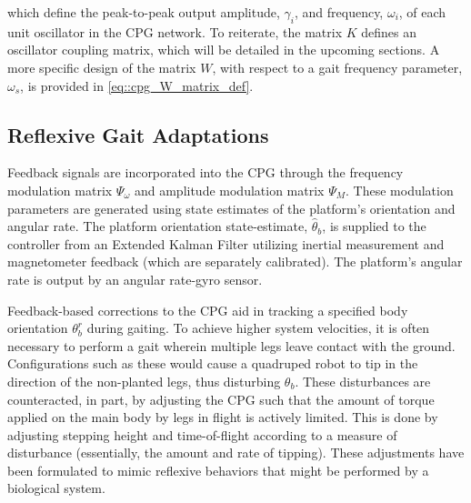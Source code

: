 		which define the peak-to-peak output amplitude, $\gamma_{i}$, and frequency, $\omega_{i}$, of each \Ith unit oscillator in the CPG network. To reiterate, the matrix $K$ defines an oscillator coupling matrix, which will be detailed in the upcoming sections. A more specific design of the matrix $W$, with respect to a gait frequency parameter, $\omega_{s}$, is provided in \ref{eq::cpg_W_matrix_def}.


		\subsection{Reflexive Gait Adaptations}

			Feedback signals are incorporated into the CPG through the frequency modulation matrix $\Psi_{\omega}$ and amplitude modulation matrix $\Psi_{M}$. These modulation parameters are generated using state estimates of the platform's orientation and angular rate. The platform orientation state-estimate, $\hat{\theta}_{b}$, is supplied to the controller from an Extended Kalman Filter utilizing inertial measurement and magnetometer feedback (which are separately calibrated). The platform's angular rate is output by an angular rate-gyro sensor.

			Feedback-based corrections to the CPG aid in tracking a specified body orientation $\theta_{b}^{r}$ during gaiting. To achieve higher system velocities, it is often necessary to perform a gait wherein multiple legs leave contact with the ground. Configurations such as these would cause a quadruped robot to tip in the direction of the non-planted legs, thus disturbing $\theta_{b}$. These disturbances are counteracted, in part, by adjusting the CPG such that the amount of torque applied on the main body by legs in flight is actively limited. This is done by adjusting stepping height and time-of-flight according to a measure of disturbance (essentially, the amount and rate of tipping). These adjustments have been formulated to mimic reflexive behaviors that might be performed by a biological system.

